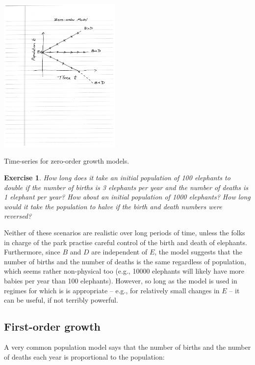 \documentclass{tufte-handout}
\newtheorem{del}{Exercise}
\begin{document}
\begin{marginfigure}
\includegraphics[width=6cm]{figs/zero_order}
\caption{Time-series for zero-order growth models. }
\end{marginfigure}

\begin{del}
How long does it take an initial population of 100 elephants to double if the number of births is 3 elephants per year and the number of deaths is 1 elephant per year? How about an initial population of 1000 elephants? How long would it take the population to halve if the birth and death numbers were reversed?
\end{del}

Neither of these scenarios are realistic over long periods of time, unless the folks in charge of the park practise careful control of the birth and death of elephants. Furthermore, since $B$ and $D$ are independent of $E$, the model suggests that the number of births and the number of deaths is the same regardless of population, which seems rather non-physical too (e.g., 10000 elephants will likely have more babies per year than 100 elephants). However, so long as the model is used in regimes for which is is appropriate -- e.g., for relatively small changes in $E$ -- it can be useful, if not terribly powerful.


\subsection{First-order growth}

A very common population model says that the number of births and the number of deaths each year is proportional to the population:
\end{document}
